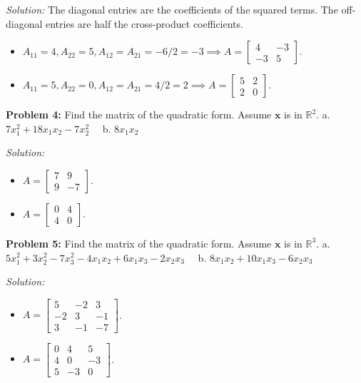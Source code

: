 \documentclass[11pt, letterpaper]{article}
\theoremstyle{definition}
\theoremstyle{remark}
\newcommand{\R}{\mathbb{R}}
\newcommand{\x}{\mathbf{x}}
\begin{document}
\textit{Solution:} The diagonal entries are the coefficients of the squared terms. The off-diagonal entries are half the cross-product coefficients.
\begin{itemize}
    \item[\textbf{a.}] $A_{11} = 4, A_{22} = 5, A_{12} = A_{21} = -6/2 = -3 \implies A = \begin{bmatrix} 4 & -3 \\ -3 & 5 \end{bmatrix}$.
    \item[\textbf{b.}] $A_{11} = 5, A_{22} = 0, A_{12} = A_{21} = 4/2 = 2 \implies A = \begin{bmatrix} 5 & 2 \\ 2 & 0 \end{bmatrix}$.
\end{itemize}

\textbf{Problem 4:} Find the matrix of the quadratic form. Assume $\x$ is in $\R^2$.
a. $7x_1^2 + 18x_1 x_2 - 7x_2^2 \quad$ b. $8x_1 x_2$

\textit{Solution:}
\begin{itemize}
    \item[\textbf{a.}] $A = \begin{bmatrix} 7 & 9 \\ 9 & -7 \end{bmatrix}$.
    \item[\textbf{b.}] $A = \begin{bmatrix} 0 & 4 \\ 4 & 0 \end{bmatrix}$.
\end{itemize}

\textbf{Problem 5:} Find the matrix of the quadratic form. Assume $\x$ is in $\R^3$.
a. $5x_1^2 + 3x_2^2 - 7x_3^2 - 4x_1 x_2 + 6x_1 x_3 - 2x_2 x_3 \quad$ b. $8x_1 x_2 + 10x_1 x_3 - 6x_2 x_3$

\textit{Solution:}
\begin{itemize}
    \item[\textbf{a.}] $A = \begin{bmatrix} 5 & -2 & 3 \\ -2 & 3 & -1 \\ 3 & -1 & -7 \end{bmatrix}$.
    \item[\textbf{b.}] $A = \begin{bmatrix} 0 & 4 & 5 \\ 4 & 0 & -3 \\ 5 & -3 & 0 \end{bmatrix}$.
\end{itemize}
\end{document}
